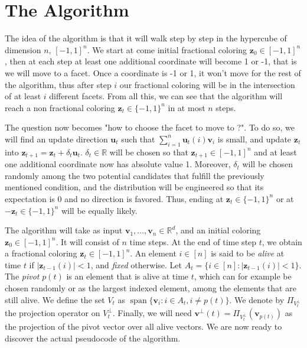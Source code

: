 \documentclass[12pt]{article}
\DeclareMathOperator{\Span}{span}
\begin{document}
\section{The Algorithm}
The idea of the algorithm is that it will walk step by step in the hypercube of dimension $n$, $[-1,1]^n$. We start at come initial fractional coloring $\textbf{z}_0\in[-1,1]^n$, then at each step at least one additional coordinate will become 1 or -1, that is we will move to a facet. Once a  coordinate is -1 or 1, it won't move for the rest of the algorithm, thus after step $i$ our fractional coloring will be in the intersection of at least $i$ different facets. From all this, we can see that the algorithm will reach a non fractional coloring $\textbf{z}_t\in\{-1,1\}^n$ in at most $n$ steps.

The question now becomes "how to choose the facet to move to ?". To do so, we will find an update direction $\textbf{u}_t$ such that $\sum_{i=1}^n\textbf{u}_t(i)\textbf{v}_i$ is small, and update $\textbf{z}_t$ into $\textbf{z}_{t+1}=\textbf{z}_t+\delta_t\textbf{u}_t$. $\delta_t\in\mathbb{R}$ will be chosen so that $\textbf{z}_{t+1}\in[-1,1]^n$ and at least one additional coordinate now has absolute value 1. Moreover, $\delta_t$ will be chosen randomly among the two potential candidates that fulfill the previously mentioned condition, and the distribution will be engineered so that its expectation is 0 and no direction is favored. Thus, ending at $\textbf{z}_t\in\{-1,1\}^n$ or at $-\textbf{z}_t\in\{-1,1\}^n$ will be equally likely.

The algorithm will take as input $\textbf{v}_1,\ldots,\textbf{v}_n\in\mathbb{R}^d$, and an initial coloring $\textbf{z}_0\in[-1,1]^n$. It will consist of $n$ time steps. At the end of time step $t$, we obtain a fractional coloring $\textbf{z}_t\in[-1,1]^n$. An element $i \in [n]$ is said to be \textit{alive} at time $t$ if $|\textbf{z}_{t-1}(i)|<1$, and \textit{fixed} otherwise. Let $A_t=\{i\in[n]:|\textbf{z}_{t-1}(i)|<1\}$. The \textit{pivot} $p(t)$ is an element that is alive at time $t$, which can for example be chosen randomly or as the largest indexed element, among the elements that are still alive. We define the set $V_t$ as $\Span\{\textbf{v}_i:i\in A_t,i\not=p(t)\}$. We denote by $\Pi_{V_t^\perp}$ the projection operator on $V_t^\perp$. Finally, we will need $\textbf{v}^{\perp}(t)=\Pi_{V_t^\perp}(\textbf{v}_{p(t)})$ as the projection of the pivot vector over all alive vectors. We are now ready to discover the actual pseudocode of the algorithm.
\end{document}
